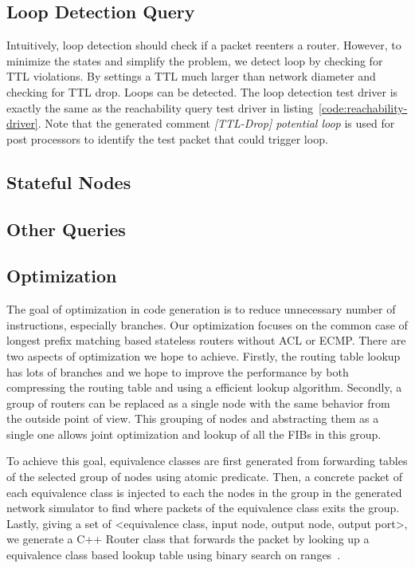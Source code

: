 \documentclass[letterpaper, 10 pt, conference]{ieeeconf}  %
\begin{document}
\subsection{Loop Detection Query}
Intuitively, loop detection should check if a packet reenters a router. However, to minimize the states and simplify the problem, we detect loop by checking for TTL violations. By settings a TTL much larger than network diameter and checking for TTL drop. Loops can be detected. The loop detection test driver is exactly the same as the reachability query test driver in listing~\ref{code:reachability-driver}. Note that the generated comment \emph{[TTL-Drop] potential loop} is used for post processors to identify the test packet that could trigger loop.
\subsection{Stateful Nodes}

\subsection{Other Queries}

\subsection{Optimization}\label{sec:opt}
The goal of optimization in code generation is to reduce unnecessary number of instructions, especially branches. Our optimization focuses on the common case of longest prefix matching based stateless routers without ACL or ECMP. There are two aspects of optimization we hope to achieve. Firstly, the routing table lookup has lots of branches and we hope to improve the performance by both compressing the routing table and using a efficient lookup algorithm. Secondly, a group of routers can be replaced as a single node with the same behavior from the outside point of view. This grouping of nodes and abstracting them as a single one allows joint optimization and lookup of all the FIBs in this group.

To achieve this goal, equivalence classes are first generated from forwarding tables of the selected group of nodes using atomic predicate. Then, a concrete packet of each equivalence class is injected to each the nodes in the group in the generated network simulator to find where packets of the equivalence class exits the group. Lastly, giving a set of <equivalence class, input node, output node, output port>, we generate a C++ Router class that forwards the packet by looking up a equivalence class based lookup table using binary search on ranges~\cite{binary_search_lookup}.
\end{document}
